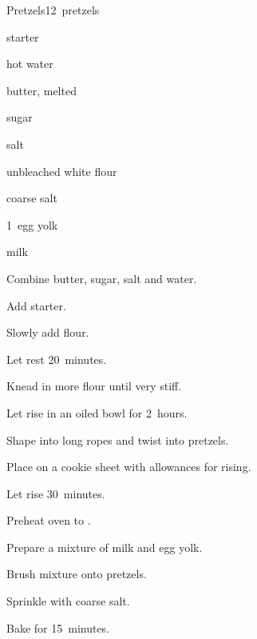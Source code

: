 \begin{recipe}{Pretzels}{}{12~pretzels}

\begin{ingredients}
\item {} starter
\item \C{\half} hot water
\item {} butter, melted
\item \Tp{1\half} sugar
\item {} salt
\item {} unbleached white flour
\item coarse salt
\item 1~egg yolk
\item {} milk
\end{ingredients}

\begin{directions}
\item Combine butter, sugar, salt and water.
\item Add starter.
\item Slowly add  flour.
\item Let rest 20~minutes.
\item Knead in more flour until very stiff.
\item Let rise in an oiled bowl for 2~hours.
\item Shape into long ropes and twist into pretzels.
\item Place on a cookie sheet with allowances for rising.
\item Let rise 30~minutes.
\item Preheat oven to .
\item Prepare a mixture of milk and egg yolk.
\item Brush mixture onto pretzels.
\item Sprinkle with coarse salt.
\item Bake for 15~minutes.
\end{directions}
\end{recipe}
